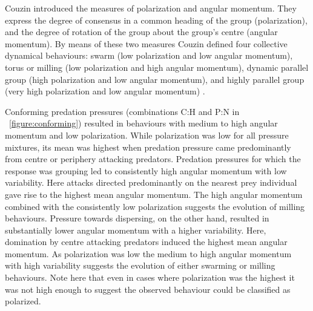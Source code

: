 Couzin\etal \cite{couzin2002collective} introduced the measures of polarization and angular momentum. They express the degree of consensus in a common heading of the group (polarization), and the degree of rotation of the group about the group's centre (angular momentum). By means of these two measures Couzin\etal \cite{couzin2002collective} defined four collective dynamical behaviours: swarm (low polarization and low angular momentum), torus or milling (low polarization and high angular momentum), dynamic parallel group (high polarization and low angular momentum), and highly parallel group (very high polarization and low angular momentum) \cite{couzin2002collective}.

Conforming predation pressures (combinations C:H and P:N in \figurename~\ref{figure:conforming}) resulted in behaviours with medium to high angular momentum and low polarization. While polarization was low for all pressure mixtures, its mean was highest when predation pressure came predominantly from centre or periphery attacking predators. Predation pressures for which the response was grouping led to consistently high angular momentum with low variability. Here attacks directed predominantly on the nearest prey individual gave rise to the highest mean angular momentum. The high angular momentum combined with the consistently low polarization suggests the evolution of milling behaviours. Pressure towards dispersing, on the other hand, resulted in substantially lower angular momentum with a higher variability. Here, domination by centre attacking predators induced the highest mean angular momentum. As polarization was low the medium to high angular momentum with high variability suggests the evolution of either swarming or milling behaviours. Note here that even in cases where polarization was the highest it was not high enough to suggest the observed behaviour could be classified as polarized.

